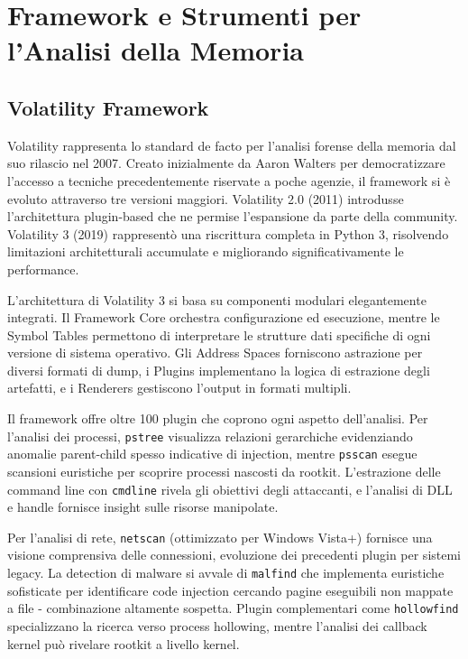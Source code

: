 \section{Framework e Strumenti per l'Analisi della Memoria}

\subsection{Volatility Framework}

Volatility \cite{volatility2024} rappresenta lo standard de facto per l'analisi forense della memoria dal suo rilascio nel 2007. Creato inizialmente da Aaron Walters per democratizzare l'accesso a tecniche precedentemente riservate a poche agenzie, il framework si è evoluto attraverso tre versioni maggiori. Volatility 2.0 (2011) introdusse l'architettura plugin-based che ne permise l'espansione da parte della community. Volatility 3 (2019) rappresentò una riscrittura completa in Python 3, risolvendo limitazioni architetturali accumulate e migliorando significativamente le performance.

L'architettura di Volatility 3 si basa su componenti modulari elegantemente integrati. Il Framework Core orchestra configurazione ed esecuzione, mentre le Symbol Tables permettono di interpretare le strutture dati specifiche di ogni versione di sistema operativo. Gli Address Spaces forniscono astrazione per diversi formati di dump, i Plugins implementano la logica di estrazione degli artefatti, e i Renderers gestiscono l'output in formati multipli.

Il framework offre oltre 100 plugin che coprono ogni aspetto dell'analisi. Per l'analisi dei processi, \texttt{pstree} visualizza relazioni gerarchiche evidenziando anomalie parent-child spesso indicative di injection, mentre \texttt{psscan} esegue scansioni euristiche per scoprire processi nascosti da rootkit. L'estrazione delle command line con \texttt{cmdline} rivela gli obiettivi degli attaccanti, e l'analisi di DLL e handle fornisce insight sulle risorse manipolate.

Per l'analisi di rete, \texttt{netscan} (ottimizzato per Windows Vista+) fornisce una visione comprensiva delle connessioni, evoluzione dei precedenti plugin per sistemi legacy. La detection di malware si avvale di \texttt{malfind} che implementa euristiche sofisticate per identificare code injection cercando pagine eseguibili non mappate a file - combinazione altamente sospetta. Plugin complementari come \texttt{hollowfind} specializzano la ricerca verso process hollowing, mentre l'analisi dei callback kernel può rivelare rootkit a livello kernel.

